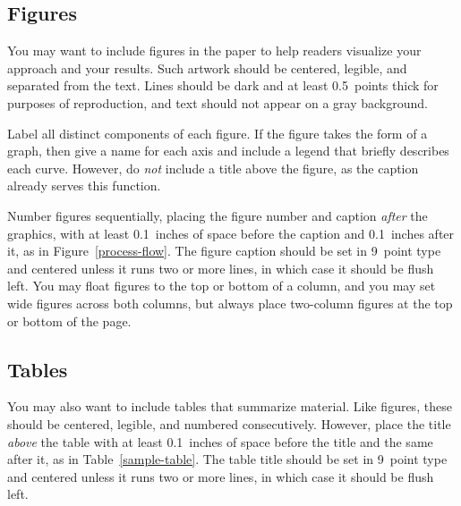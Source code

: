\subsection{Figures}
 
You may want to include figures in the paper to help readers visualize
your approach and your results. Such artwork should be centered,
legible, and separated from the text. Lines should be dark and at
least 0.5~points thick for purposes of reproduction, and text should
not appear on a gray background.


Label all distinct components of each figure. If the figure takes
the form of a graph, then give a name for each axis and include a 
legend that briefly describes each curve. However, do {\it not\/} 
include a title above the figure, as the caption already serves
this function. 

Number figures sequentially, placing the figure number and caption 
{\it after\/} the graphics, with at least 0.1~inches of space before the
caption and 0.1~inches after it, as in Figure~\ref{process-flow}. 
The figure caption should be set in 9~point type and centered unless
it runs two or more lines, in which case it should be flush left. 
You may float figures to the top or bottom of a column, and you may
set wide figures across both columns, but always place two-column
figures at the top or bottom of the page.

 
\subsection{Tables} 
 
You may also want to include tables that summarize material. Like 
figures, these should be centered, legible, and numbered consecutively. 
However, place the title {\it above\/} the table with at least 
0.1~inches of space before the title and the same after it, as in 
Table~\ref{sample-table}. The table title should be set in 9~point 
type and centered unless it runs two or more lines, in which case it
should be flush left.

